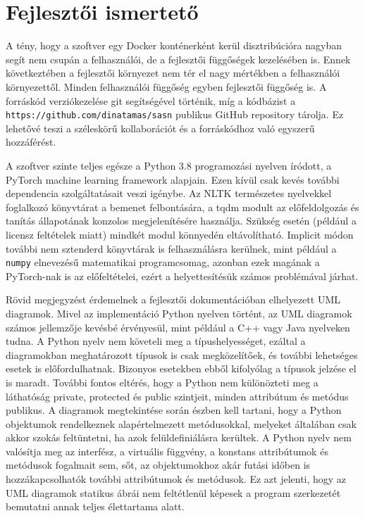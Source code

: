 \documentclass[twoside, 12pt]{report}
\begin{document}
\section{Fejlesztői ismertető}

A tény, hogy a szoftver egy Docker konténerként kerül disztribúcióra nagyban segít nem csupán a felhasználói, de a fejlesztői függőségek kezelésében is. Ennek következtében a fejlesztői környezet nem tér el nagy mértékben a felhasználói környezettől. Minden felhasználói függőség egyben fejlesztői függőség is. A forráskód verziókezelése git segítségével történik, míg a kódbázist a \verb|https://github.com/dinatamas/sasn| publikus GitHub repository tárolja. Ez lehetővé teszi a széleskörű kollaborációt és a forráskódhoz való egyszerű hozzáférést.

A szoftver szinte teljes egésze a Python 3.8 programozási nyelven íródott, a PyTorch\footnotemark{} machine learning framework alapjain. Ezen kívül csak kevés további dependencia szolgáltatásait veszi igénybe. Az NLTK \parencite{BKL09a} természetes nyelvekkel foglalkozó könyvtárat a bemenet felbontására, a tqdm\footnotemark{} modult az előfeldolgozás és tanítás állapotának konzolos megjelenítésére használja. Szükség esetén (például a licensz feltételek miatt) mindkét modul könnyedén eltávolítható. Implicit módon további nem sztenderd könyvtárak is felhasználásra kerülnek, mint például a \verb|numpy| elnevezésű matematikai programcsomag\footnotemark{}, azonban ezek magának a PyTorch-nak is az előfeltételei, ezért a helyettesítésük számos problémával járhat.


Rövid megjegyzést érdemelnek a fejlesztői dokumentációban elhelyezett UML diagramok. Mivel az implementáció Python nyelven történt, az UML diagramok számos jellemzője kevésbé érvényesül, mint például a C++ vagy Java nyelveken tudna. A Python nyelv nem követeli meg a típushelyességet, ezáltal a diagramokban meghatározott típusok is csak megközelítőek, és további lehetséges esetek is előfordulhatnak. Bizonyos esetekben ebből kifolyólag a típusok jelzése el is maradt. További fontos eltérés, hogy a Python nem különözteti meg a láthatóság private, protected és public szintjeit, minden attribútum és metódus publikus. A diagramok megtekintése során észben kell tartani, hogy a Python objektumok rendelkeznek alapértelmezett metódusokkal, melyeket általában csak akkor szokás feltüntetni, ha azok felüldefiniálásra kerültek. A Python nyelv nem valósítja meg az interfész, a virtuális függvény, a konstans attribútumok és metódusok fogalmait sem, sőt, az objektumokhoz akár futási időben is hozzákapcsolhatók további attribútumok és metódusok. Ez azt jelenti, hogy az UML diagramok statikus ábrái nem feltétlenül képesek a program szerkezetét bemutatni annak teljes élettartama alatt.
\end{document}
